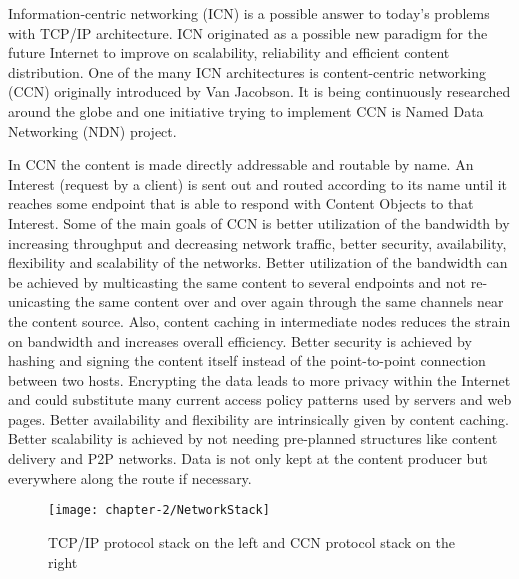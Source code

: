 Information-centric networking (ICN) is a possible answer to today's problems with TCP/IP architecture. ICN originated as a possible new paradigm for the future Internet to improve on scalability, reliability and efficient content distribution. One of the many ICN architectures is content-centric networking (CCN) originally introduced by Van Jacobson. It is being continuously researched around the globe and one initiative trying to implement CCN is Named Data Networking (NDN) project.

\vspace{5mm} %

In CCN the content is made directly addressable and routable by name. An Interest (request by a client) is sent out and routed according to its name until it reaches some endpoint that is able to respond with Content Objects to that Interest. Some of the main goals of CCN is better utilization of the bandwidth by increasing throughput and decreasing network traffic, better security, availability, flexibility and scalability of the networks. Better utilization of the bandwidth can be achieved by multicasting the same content to several endpoints and not re-unicasting the same content over and over again through the same channels near the content source. Also, content caching in intermediate nodes reduces the strain on bandwidth and increases overall efficiency. Better security is achieved by hashing and signing the content itself instead of the point-to-point connection between two hosts. Encrypting the data leads to more privacy within the Internet and could substitute many current access policy patterns used by servers and web pages. Better availability and flexibility are intrinsically given by content caching. Better scalability is achieved by not needing pre-planned structures like content delivery and P2P networks. Data is not only kept at the content producer but everywhere along the route if necessary.

\vspace{5mm} %

\begin{figure}[H]
  \centering
  \texttt{[image: chapter-2/NetworkStack]}
  \caption{TCP/IP protocol stack on the left and CCN protocol stack on the right}
  \label{fig:NetworkStack}
\end{figure}

\newpage

